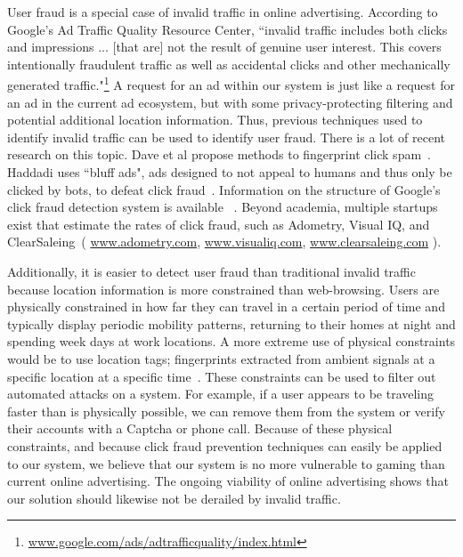 User fraud is a special case of invalid traffic in online advertising.
According to Google's Ad Traffic Quality Resource Center, ``invalid traffic includes both clicks and impressions ... [that are] not the result of genuine user interest. This covers intentionally fraudulent traffic as well as accidental clicks and other mechanically generated traffic."\footnote{\url{www.google.com/ads/adtrafficquality/index.html}}
A request for an ad within our system is just like a request for an ad in the current ad ecosystem, but with some privacy-protecting filtering and potential additional location information.
Thus, previous techniques used to identify invalid traffic can be used to identify user fraud.
There is a lot of recent research on this topic.
Dave et al propose methods to fingerprint click spam~\cite{clickspam}.
Haddadi uses ``bluff ads", ads designed to not appeal to humans and thus only be clicked by bots, to defeat click fraud~\cite{bluffad}.
Information on the structure of Google's click fraud detection system is available ~\cite{googleClick1}. %
Beyond academia, multiple startups exist that estimate the rates of click fraud,
such as Adometry, Visual IQ, and ClearSaleing~(%
\url{www.adometry.com}, \url{www.visualiq.com}, \url{www.clearsaleing.com}
).

Additionally, it is easier to detect user fraud than traditional invalid traffic because location information is more constrained than web-browsing.
Users are physically constrained in how far they can travel in a certain period of time
and typically display periodic mobility patterns, returning to their homes at night and spending week days at work locations.
A more extreme use of physical constraints would be to use location tags; fingerprints extracted from ambient signals at a specific location at a specific time~\cite{NarayananTLHB11}.
These constraints can be used to filter out automated attacks on a system. 
For example, if a user appears to be traveling faster than is physically possible, we can remove them from the system or verify their accounts with a Captcha or phone call.
Because of these physical constraints, and because click fraud prevention techniques can easily be applied to our system, we believe that our system is no more vulnerable to gaming than current online advertising. 
The ongoing viability of online advertising shows that our solution should likewise not be derailed by invalid traffic.

